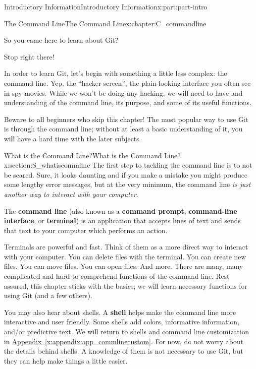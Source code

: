 \documentclass[oneside,10pt,]{book}
\newcommand{\xreffont}{\relax}
\newcommand{\terminology}[1]{\textbf{#1}}
\begin{document}
\begin{partptx}{Introductory Information}{}{Introductory Information}{}{}{x:part:part-intro}
\begin{chapterptx}{The Command Line}{}{The Command Line}{}{}{x:chapter:C_commandline}
\begin{introduction}{}
So you came here to learn about Git?%
\par
Stop right there!%
\par
In order to learn Git, let's begin with something a little less complex: the command line. Yep, the ``hacker screen'', the plain-looking interface you often see in spy movies. While we won't be doing any hacking, we will need to have and understanding of the command line, its purpose, and some of its useful functions.%
\par
Beware to all beginners who skip this chapter! The most popular way to use Git is through the command line; without at least a basic understanding of it, you will have a hard time with the later subjects.%
\end{introduction}%
%
%
\typeout{************************************************}
\typeout{************************************************}
%
\begin{sectionptx}{What is the Command Line?}{}{What is the Command Line?}{}{}{x:section:S_whatiscommline}
%
%
%
%
%
The first step to tackling the command line is to not be scared. Sure, it looks daunting and if you make a mistake you might produce some lengthy error messages, but at the very minimum, the command line \emph{is just another way to interact with your computer}.%
\par
The \terminology{command line} (also known as a \terminology{command prompt}, \terminology{command-line interface}, or \terminology{terminal}) is an application that accepts lines of text and sends that text to your computer which performs an action.%
\par
Terminals are powerful and fast. Think of them as a more direct way to interact with your computer. You can delete files with the terminal. You can create new files. You can move files. You can open files. And more. There are many, many complicated and hard-to-comprehend functions of the command line. Rest assured, this chapter sticks with the basics; we will learn necessary functions for using Git (and a few others).%
\par
You may also hear about shells. A \terminology{shell} helps make the command line more interactive and user friendly. Some shells add colors,  informative information, and\slash{}or predictive text. We will return to shells and command line customization in \hyperref[x:appendix:app_commlinecustom]{Appendix~{\xreffont\ref{x:appendix:app_commlinecustom}}}. For now, do not worry about the details behind shells. A knowledge of them is not necessary to use Git, but they can help make things a little easier.%

\end{sectionptx}
\end{chapterptx}
\end{partptx}
\end{document}
